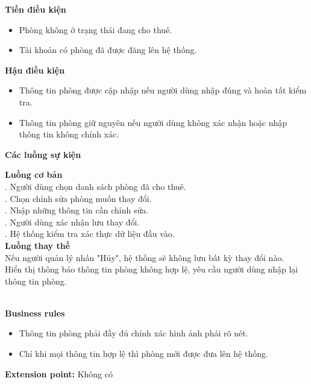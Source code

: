 \textbf{Tiền điều kiện}
\begin{itemize}
    \item Phòng không ở trạng thái đang cho thuê.
    \item Tài khoản có phòng đã được đăng lên hệ thống.
\end{itemize}

\textbf{Hậu điều kiện}
\begin{itemize}
    \item Thông tin phòng được cập nhập nếu người dùng nhập đúng và hoàn tất kiểm tra.
    \item Thông tin phòng giữ nguyên nếu người dùng không xác nhận hoặc nhập thông tin không chính xác.
\end{itemize}

\textbf{Các luồng sự kiện}

\begin{small}
\textbf{Luồng cơ bản}\\
. Người dùng chọn danh sách phòng đã cho thuê.\\
. Chọn chỉnh sửa phòng muốn thay đổi.\\
. Nhập những thông tin cần chỉnh sửa.\\
. Người dùng xác nhận lưu thay đổi.\\
. Hệ thống kiểm tra xác thực dữ liệu đầu vào.\\

\textbf{Luồng thay thế}\\
 Nếu người quản lý nhấn "Hủy", hệ thống sẽ không lưu bất kỳ thay đổi nào.\\
 Hiển thị thông báo thông tin phòng không hợp lệ, yêu cầu người dùng nhập lại thông tin phòng.
\end{small}\\
\textbf{\indent Business rules}
\begin{itemize}
    \item Thông tin phòng phải đầy đủ chính xác hình ảnh phải rõ nét.
    \item Chỉ khi mọi thông tin hợp lệ thì phòng mới được đưa lên hệ thống.
\end{itemize}

\textbf{Extension point:} Không có



